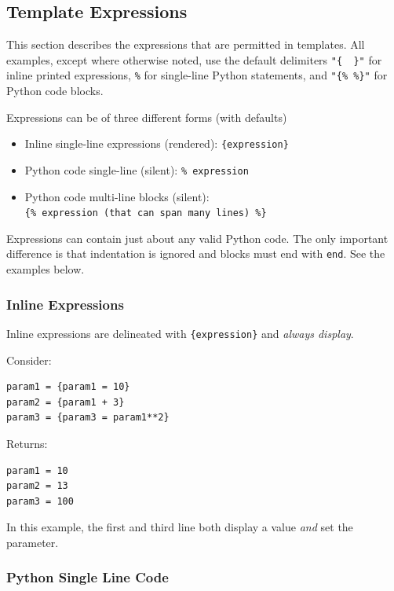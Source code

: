 {\subsection{Template Expressions}\label{interfaces:template-expressions}

This section describes the expressions that are permitted in templates. All 
examples, except where otherwise noted, use the default delimiters 
\texttt{"\{\ \ \}"} for inline printed expressions, \texttt{\%} for single-line 
Python statements, and \texttt{"\{\%\ \%\}"} for Python code blocks.

Expressions can be of three different forms (with defaults)

\begin{itemize}
\tightlist
\item
  Inline single-line expressions (rendered): \texttt{\{expression\}}
\item
  Python code single-line (silent): \texttt{\%\ expression}
\item
  Python code multi-line blocks (silent):
  \texttt{\{\%\ expression\ (that\ can\ span\ many\ lines)\ \%\}}
\end{itemize}

Expressions can contain just about any valid Python code. The only
important difference is that indentation is ignored and blocks must end 
with \texttt{end}. See the examples below.

\subsubsection{Inline Expressions}\label{interfaces:inline-expressions}

Inline expressions are delineated with \texttt{\{expression\}} and
\emph{always display}.

Consider:

\begin{verbatim}
param1 = {param1 = 10}
param2 = {param1 + 3}
param3 = {param3 = param1**2}
\end{verbatim}

Returns:

\begin{verbatim}
param1 = 10
param2 = 13
param3 = 100
\end{verbatim}

In this example, the first and third line both display a value
\emph{and} set the parameter.

\subsubsection{Python Single Line Code}\label{interfaces:python-single-line-code}

}
